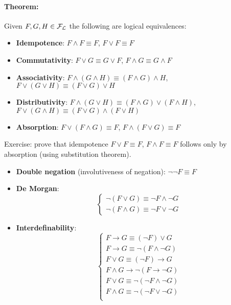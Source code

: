 \documentclass[11pt]{article}
\begin{document}
	\newpage
	
	\paragraph{Theorem:} Given $F,G,H \in \mathcal{F}_\mathcal{L}$ the following are logical equivalences:
	\begin{itemize}
		\item \textbf{Idempotence}: $F \wedge F \equiv F$, $F \vee F \equiv F$
		\item \textbf{Commutativity}: $F \vee G \equiv G \vee F$, $F \wedge G \equiv G \wedge F$
		\item \textbf{Associativity}: $F \wedge (G \wedge H) \equiv (F \wedge G) \wedge H$, $F \vee (G \vee H) \equiv (F \vee G) \vee H$
		\item \textbf{Distributivity}: $F \wedge (G \vee H) \equiv (F \wedge G) \vee (F \wedge H)$, $F \vee (G \wedge H) \equiv (F \vee G) \wedge (F \vee H)$
		\item \textbf{Absorption}: $F \vee (F \wedge G) \equiv F$, $F \wedge (F \vee G) \equiv F$
	\end{itemize}
	

	Exercise: prove that idempotence $F \vee F \equiv F$, $F \wedge F \equiv F$ follows only by absorption (using substitution theorem).\\
	
	\begin{itemize}
		\item \textbf{Double negation} (involutiveness of negation): $\neg \neg F \equiv F$
		
		\item \textbf{De Morgan}: 
		$$ \begin{cases}
			\neg (F \vee G) \equiv \neg F \wedge \neg G \\
			\neg (F \wedge G) \equiv \neg F \vee \neg G
		\end{cases}$$
		
		\item \textbf{Interdefinability}:
		$$ \begin{cases}
			F \rightarrow G \equiv (\neg F) \vee G  \\
			F \rightarrow G \equiv \neg (F \wedge \neg G) \\
			F \vee G \equiv (\neg F) \rightarrow G \\
			F \wedge G \rightarrow \neg (F \rightarrow \neg G) \\
			F \vee G \equiv \neg (\neg F \wedge \neg G) \\
			F \wedge G \equiv \neg (\neg F \vee \neg G) \\
		\end{cases}$$
	\end{itemize}
	
\end{document}
